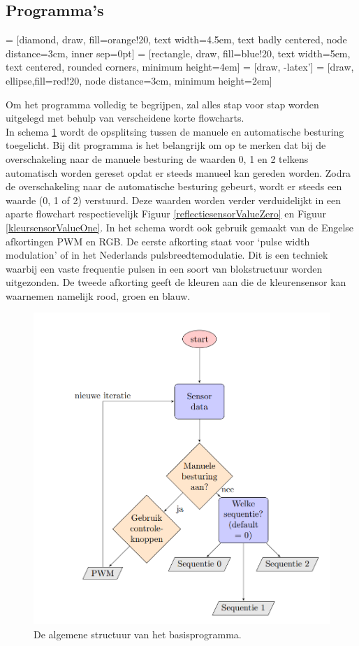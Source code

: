 \documentclass[a4paper,twoside,kulak]{kulakreport} %
\begin{document}
\subsection{Programma's}\label{definitieve programma's}
 = [diamond, draw, fill=orange!20, text width=4.5em, text badly centered, node distance=3cm, inner sep=0pt]
 = [rectangle, draw, fill=blue!20, text width=5em, text centered, rounded corners, minimum height=4em]
 = [draw, -latex']
 = [draw, ellipse,fill=red!20, node distance=3cm,
minimum height=2em]


Om het programma volledig te begrijpen, zal alles stap voor stap worden uitgelegd met behulp van verscheidene korte flowcharts. \\
In schema \ref{programmaBegin} wordt de opsplitsing tussen de manuele en automatische besturing toegelicht. Bij dit programma is het belangrijk om op te merken dat bij de overschakeling naar de manuele besturing de waarden 0, 1 en 2 telkens automatisch worden gereset opdat er steeds manueel kan gereden worden. %
Zodra de overschakeling naar de automatische besturing gebeurt, wordt er steeds een waarde (0, 1 of 2) verstuurd. Deze waarden worden verder verduidelijkt in een aparte flowchart respectievelijk Figuur \ref{reflectiesensorValueZero} en Figuur \ref{kleursensorValueOne}. %
In het schema wordt ook gebruik gemaakt van de Engelse afkortingen PWM en RGB. De eerste afkorting staat voor `pulse width modulation' of in het Nederlands pulsbreedtemodulatie. Dit is een techniek waarbij een vaste frequentie pulsen in een soort van blokstructuur worden uitgezonden. %
De tweede afkorting geeft de kleuren aan die de kleurensensor kan waarnemen namelijk rood, groen en blauw.
\\
\begin{figure}
	\centering
	\includegraphics[width=.6\textwidth]{flowchartBegin}
	\caption{De algemene structuur van het basisprogramma.}
	\label{programmaBegin}
\end{figure}
\end{document}
